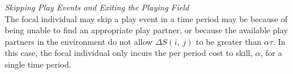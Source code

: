 \documentclass[12pt, letterpaper, fleqn]{article}
\begin{document}
	
	
	\noindent \textit{Skipping Play Events and Exiting the Playing Field}\\
	The focal individual may skip a play event in a time period may be because of being unable to find an appropriate play partner, or because the available play partners in the environment do not allow $\Delta S(i,~j)$ to be greater than $\alpha \tau$. 
	In this case, the focal individual only incurs the per period cost to skill, $\alpha$, for a single time period.
	
	
\end{document}
